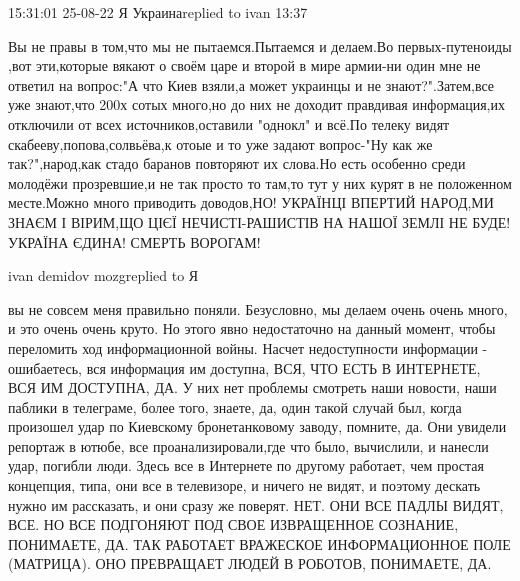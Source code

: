  
 
 
 
 

15:31:01 25-08-22
Я Украинаreplied to ivan
13:37

Вы не правы в том,что мы не пытаемся.Пытаемся и делаем.Во первых-путеноиды ,вот
эти,которые вякают о своём царе и второй в мире армии-ни один мне не ответил на
вопрос:"А что Киев взяли,а может украинцы и не знают?".Затем,все уже знают,что
200х сотых много,но до них не доходит правдивая информация,их отключили от всех
источников,оставили "однокл" и всё.По телеку видят скабееву,попова,солвьёва,к
отоые и то уже задают вопрос-"Ну как же так?",народ,как стадо баранов повторяют
их слова.Но есть особенно среди молодёжи прозревшие,и не так просто то там,то
тут у них курят в не положенном месте.Можно много приводить доводов,НО!
УКРАЇНЦІ ВПЕРТИЙ НАРОД,МИ ЗНАЄМ І ВІРИМ,ЩО ЦІЄЇ НЕЧИСТІ-РАШИСТІВ НА НАШОЇ ЗЕМЛІ
НЕ БУДЕ! УКРАЇНА ЄДИНА! СМЕРТЬ ВОРОГАМ!

ivan demidov mozgreplied to Я

вы не совсем меня правильно поняли. Безусловно, мы делаем очень очень много, и
это очень очень круто. Но этого явно недостаточно на данный момент, чтобы
переломить ход информационной войны. Насчет недоступности информации -
ошибаетесь, вся информация им доступна, ВСЯ, ЧТО ЕСТЬ В ИНТЕРНЕТЕ, ВСЯ ИМ
ДОСТУПНА, ДА. У них нет проблемы смотреть наши новости, наши паблики в
телеграме, более того, знаете, да, один такой случай был, когда произошел удар
по Киевскому бронетанковому заводу, помните, да. Они увидели репортаж в ютюбе,
все проанализировали,где что было, вычислили, и нанесли удар, погибли люди.
Здесь все в Интернете по другому работает, чем простая концепция, типа, они все
в телевизоре, и ничего не видят, и поэтому дескать нужно им рассказать, и они
сразу же поверят. НЕТ. ОНИ ВСЕ ПАДЛЫ ВИДЯТ, ВСЕ. НО ВСЕ ПОДГОНЯЮТ ПОД СВОЕ
ИЗВРАЩЕННОЕ СОЗНАНИЕ, ПОНИМАЕТЕ, ДА. ТАК РАБОТАЕТ ВРАЖЕСКОЕ ИНФОРМАЦИОННОЕ ПОЛЕ
(МАТРИЦА). ОНО ПРЕВРАЩАЕТ ЛЮДЕЙ В РОБОТОВ, ПОНИМАЕТЕ, ДА.
